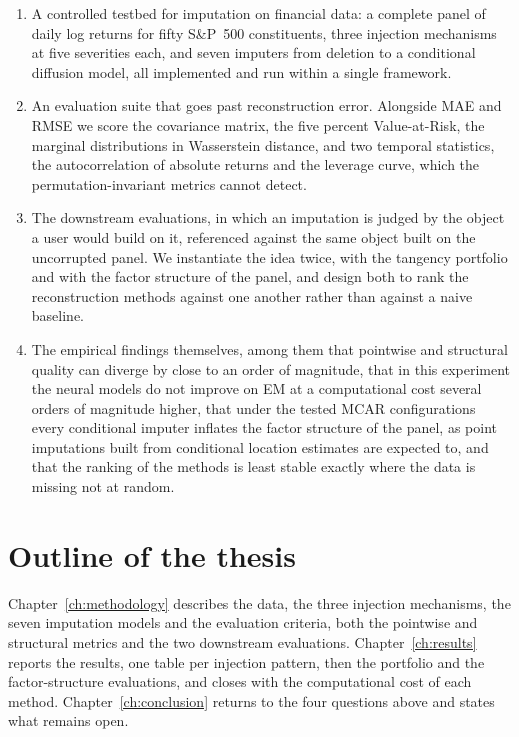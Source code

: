 \begin{enumerate}
    \item A controlled testbed for imputation on financial data: a complete
    panel of daily log returns for fifty S\&P~500 constituents, three
    injection mechanisms at five severities each, and seven imputers from
    deletion to a conditional diffusion model, all implemented and run within
    a single framework.

    \item An evaluation suite that goes past reconstruction error. Alongside
    MAE and RMSE we score the covariance matrix, the five percent
    Value-at-Risk, the marginal distributions in Wasserstein distance, and two
    temporal statistics, the autocorrelation of absolute returns and the
    leverage curve, which the permutation-invariant metrics cannot detect.

    \item The downstream evaluations, in which an imputation is judged by the
    object a user would build on it, referenced against the same object built
    on the uncorrupted panel. We instantiate the idea twice, with the tangency
    portfolio and with the factor structure of the panel, and design both to
    rank the reconstruction methods against one another rather than against a
    naive baseline.

    \item The empirical findings themselves, among them that pointwise and
    structural quality can diverge by close to an order of magnitude, that in
    this experiment the neural models do not improve on EM at a computational
    cost several orders of magnitude higher, that under the tested MCAR
    configurations every conditional imputer inflates the factor structure of
    the panel, as point imputations built from conditional location estimates
    are expected to, and that the ranking of the methods is least stable
    exactly where the data is missing not at random.
\end{enumerate}

\section{Outline of the thesis}
\label{sec:outline}

Chapter~\ref{ch:methodology} describes the data, the three injection
mechanisms, the seven imputation models and the evaluation criteria, both the
pointwise and structural metrics and the two downstream evaluations.
Chapter~\ref{ch:results} reports the results, one table per injection pattern,
then the portfolio and the factor-structure evaluations, and closes with the
computational cost of each method. Chapter~\ref{ch:conclusion} returns to the
four questions above and states what remains open.